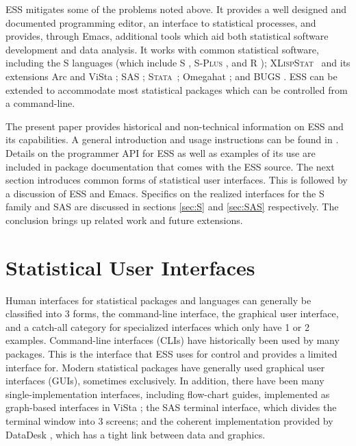 \documentclass{article}
\newcommand*{\Splus}{\textsc{S-Plus}}
\newcommand*{\XLispStat}{\textsc{XLispStat}}
\newcommand*{\Stata}{\textsc{Stata}}
\begin{document}
ESS mitigates some of the problems noted above.  It provides a well
designed and documented programming editor, an interface to
statistical processes, and provides, through Emacs, additional tools
which aid both statistical software development and data analysis.  It
works with common statistical software, including the S languages
(which include S \citep{BecRCW88,ChaJH92,ChaJ98}, \Splus{}
\citep{Splus}, and R \citep{ihak:gent:1996}); \XLispStat\
\citep{Tier90} and its extensions Arc \citep{Cook:Weisberg:1999} and
ViSta \citep{youn:fald:mcfa:1992}; SAS \citep{SAS:8.0}; \Stata\
\citep{Stata:6.0}; Omegahat \citep{DTLang:2000}; and BUGS
\citep{SpieThomBest:1999}.  ESS can be extended to accommodate most
statistical packages which can be controlled from a command-line.

The present paper provides historical and non-technical information on
ESS and its capabilities.  A general introduction and usage
instructions can be found in \cite{heiberger:dsc:2001}.  Details on
the programmer API for ESS as well as examples of its use are included
in package documentation that comes with the ESS source.  The next
section introduces common forms of statistical user interfaces.  This
is followed by a discussion of ESS and Emacs.  Specifics on the
realized interfaces for the S family and SAS are discussed in sections
\ref{sec:S} and \ref{sec:SAS} respectively.  The conclusion brings up
related work and future extensions.

\section{Statistical User Interfaces}
\label{sec:UI}

Human interfaces for statistical packages and languages can generally be
classified into 3 forms, the command-line interface, the graphical user
interface, and a catch-all category for specialized interfaces which
only have 1 or 2 examples.  Command-line interfaces (CLIs) have
historically been used by many packages.  This is the interface that ESS
uses for control and provides a limited interface for.  Modern
statistical packages have generally used graphical user interfaces
(GUIs), sometimes exclusively.  In addition, there have been many
single-implementation interfaces, including flow-chart guides,
implemented as graph-based interfaces in ViSta \citep{youn:lubi:1995};
the SAS terminal interface, which divides the terminal window into 3
screens; and the coherent implementation provided by DataDesk
\citep{vell:prat:1989}, which has a tight link between data and
graphics.
\end{document}
